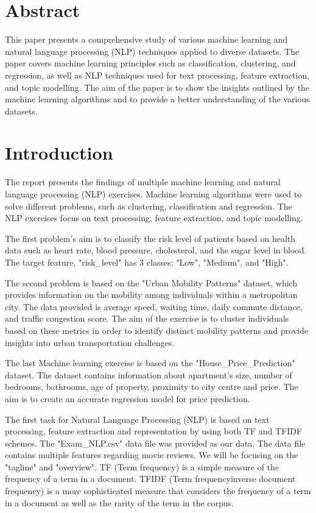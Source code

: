 \documentclass{article}
\begin{document}
\newpage
\begin{multicols}{2}


\section{Abstract}

This paper presents a comprehensive study of various machine learning and natural language processing (NLP) techniques applied to diverse datasets. The paper covers machine learning principles such as classification, clustering, and regression, as well as NLP techniques used for text processing, feature extraction, and topic modelling. The aim of the paper is to show the insights outlined by the machine learning algorithms and to provide a better understanding of the various datasets.


\section{Introduction}

The report presents the findings of multiple machine learning and natural language processing (NLP) exercises. Machine learning algorithms were used to solve different problems, such as clustering, classification and regression. The NLP exercises focus on text processing, feature extraction, and topic modelling.

The first problem's aim is to classify the risk level of patients based on health data such as heart rate, blood pressure, cholesterol, and the sugar level in blood. The target feature, "risk\_level" has 3 classes: "Low", "Medium", and "High".

The second problem is based on the "Urban Mobility Patterns" dataset, which provides information on the mobility among individuals within a metropolitan city. The data provided is average speed, waiting time, daily commute distance, and traffic congestion score. The aim of the exercise is to cluster individuals based on these metrics in order to identify distinct mobility patterns and provide insights into urban transportation challenges.

The last Machine learning exercise is based on the "House\_Price\_Prediction" dataset. The dataset contains information about apartment's size, number of bedrooms, bathrooms, age of property, proximity to city centre and price. The aim is to create an accurate regression model for price prediction.

The first task for Natural Language Processing (NLP) is based on text processing, feature extraction and representation by using both TF and TF\-IDF schemes. The "Exam\_NLP.csv" data file was provided as our data. The data file contains multiple features regarding movie reviews. We will be focusing on the "tagline" and "overview". TF (Term frequency) is a simple measure of the frequency of a term in a document. TF\-IDF (Term frequency\-inverse document frequency) is a more sophisticated measure that considers the frequency of a term in a document as well as the rarity of the term in the corpus.


\end{multicols}
\end{document}

